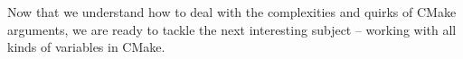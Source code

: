 Now that we understand how to deal with the complexities and quirks of CMake arguments, we are ready to tackle the next interesting subject – working with all kinds of variables in CMake.
















































































